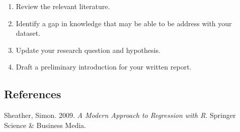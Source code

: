 \documentclass[]{article}
\providecommand{\tightlist}{%
  \setlength{\itemsep}{0pt}\setlength{\parskip}{0pt}}
\begin{document}
\begin{enumerate}
\def\labelenumi{\arabic{enumi}.}
\tightlist
\item
  Review the relevant literature.
\item
  Identify a gap in knowledge that may be able to be address with your
  dataset.
\item
  Update your research question and hypothesis.
\item
  Draft a preliminary introduction for your written report.
\end{enumerate}

\hypertarget{references}{%
\subsection*{References}\label{references}}

\hypertarget{refs}{}
\leavevmode\hypertarget{ref-sheather2009}{}%
Sheather, Simon. 2009. \emph{A Modern Approach to Regression with R}.
Springer Science \& Business Media.
\end{document}
